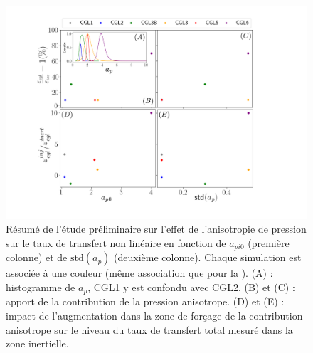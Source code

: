 \begin{figure}[!ht]
 \centering
 \includegraphics[width=0.9\linewidth,trim=3cm 1cm 5cm 1cm, clip=true]{./Mainmatter/Part_3/images_ch3/scattersimu}
\cprotect\caption{Résumé de l'étude préliminaire sur l'effet de l'anisotropie de pression sur le taux de transfert non linéaire en fonction de \ensuremath{a_{pi0}} (première colonne) et de \ensuremath{\text{std}(a_p)} (deuxième colonne). Chaque simulation est associée à une couleur (même association que pour la ). (A) : histogramme de \ensuremath{a_p}, CGL1 y est confondu avec CGL2. (B) et (C) : apport de la contribution de la pression anisotrope. (D) et (E) : impact de l'augmentation dans la zone de forçage de la contribution anisotrope sur le niveau du taux de transfert total mesuré dans la zone inertielle.}
\label{fig:scattersimu}
\end{figure}
 
